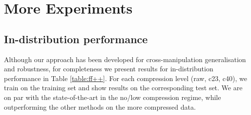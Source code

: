 \documentclass[10pt,twocolumn,letterpaper]{article}
\begin{document}
\newpage

{\small


}

\newpage
\appendix

\section{More Experiments}
\subsection{In-distribution performance}
Although our approach has been developed for cross-manipulation generalisation and robustness, for completeness we present results for in-distribution performance in Table \ref{table:ff++}. For each compression level (raw, c23, c40), we train on the training set and show results on the corresponding test set. We are on par with the state-of-the-art in the no/low compression regime, while outperforming the other methods on the more compressed data.

\begin{table}
\begin{center}
\end{center}
\caption{\textbf{In-distribution performance.} Accuracy and AUC scores on the test set of FaceForensics++ (FF++) after training on FF++. We repeat experiments for the dataset's three compression types: raw (no compression), c23 (mild compression), and c40 (strong compression. Best results are in \textbf{bold}.}
\label{table:ff++}
\end{table}
\end{document}
